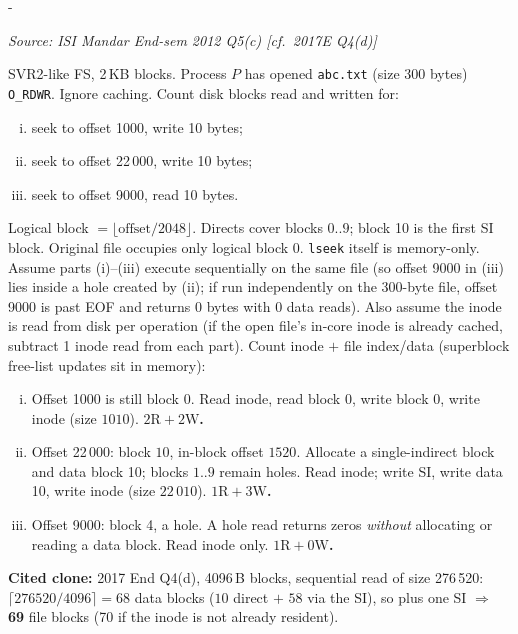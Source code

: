\documentclass[11pt,a4paper]{article}
\makeatletter
\newcommand{\keepspace}[1]{\par\penalty-100\begingroup
  \setlength{\dimen@}{#1}\dimen@ii\pagegoal\advance\dimen@ii-\pagetotal
  \ifdim\dimen@>\dimen@ii\ifdim\dimen@ii>\z@\vfil\fi\break\fi\endgroup}
\newcounter{qn}[section]
\newenvironment{Qn}[4]{%
  \refstepcounter{qn}\keepspace{7\baselineskip}%
  \begin{tcolorbox}[qboxstyle, title={Q\thesection.\theqn\ \ [#1 \textbar\ #2]\ \ #4}]%
  {\footnotesize\color{g3}\textit{Source: #3}}\par\smallskip%
}{%
  \end{tcolorbox}%
}
\newenvironment{Sol}{%
  \begin{tcolorbox}[sboxstyle, title={Solution}]%
}{%
  \end{tcolorbox}\vspace{0.35em}%
}
\makeatother
\begin{document}
\begin{Qn}{Hard}{Lect 24}{ISI Mandar End-sem 2012 Q5(c) [cf.\ 2017E Q4(d)]}{\texttt{lseek} then write/read: count disk I/Os, including holes}
SVR2-like FS, 2\,KB blocks. Process $P$ has opened \texttt{abc.txt}
(size 300 bytes) \texttt{O\_RDWR}. Ignore caching. Count disk blocks
read and written for:
\begin{enumerate}[(i)]
\item seek to offset 1000, write 10 bytes;
\item seek to offset 22\,000, write 10 bytes;
\item seek to offset 9000, read 10 bytes.
\end{enumerate}
\end{Qn}
\begin{Sol}
Logical block $= \lfloor \mathrm{offset}/2048\rfloor$. Directs cover
blocks $0..9$; block 10 is the first SI block. Original file occupies
only logical block 0. \texttt{lseek} itself is memory-only.
Assume parts (i)--(iii) execute sequentially on the same file (so
offset 9000 in (iii) lies inside a hole created by (ii); if run
independently on the 300-byte file, offset 9000 is past EOF and returns
0 bytes with 0 data reads). Also assume the inode is read from disk per
operation (if the open file's in-core inode is already cached, subtract
1 inode read from each part). Count inode $+$ file index/data (superblock
free-list updates sit in memory):
\begin{enumerate}[(i)]
\item Offset 1000 is still block 0. Read inode, read block 0, write
      block 0, write inode (size $1010$). \textbf{$2\mathrm{R}+2\mathrm{W}$.}
\item Offset 22\,000: block $10$, in-block offset $1520$. Allocate a
      single-indirect block and data block 10; blocks $1..9$ remain
      holes. Read inode; write SI, write data 10, write inode (size
      $22\,010$). \textbf{$1\mathrm{R}+3\mathrm{W}$.}
\item Offset 9000: block 4, a hole. A hole read returns zeros
      \emph{without} allocating or reading a data block. Read inode
      only. \textbf{$1\mathrm{R}+0\mathrm{W}$.}
\end{enumerate}
\textbf{Cited clone:} 2017 End Q4(d), 4096\,B blocks, sequential read of
size 276\,520: $\lceil 276520/4096\rceil=68$ data blocks ($10$ direct
$+$ $58$ via the SI), so plus one SI $\Rightarrow$ \textbf{69} file
blocks (70 if the inode is not already resident).
\end{Sol}
\end{document}
